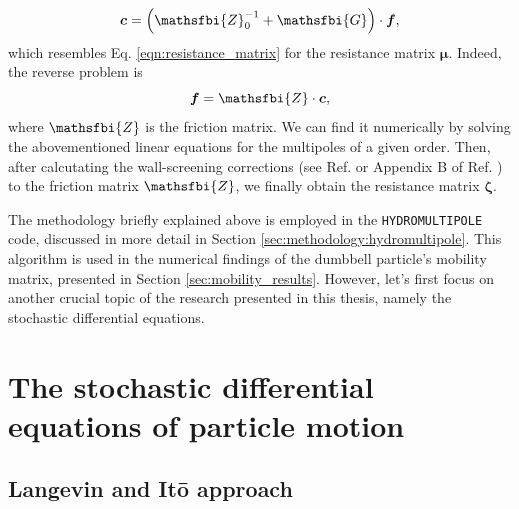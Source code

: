\documentclass{master_thesis}
\def\code#1{\texttt{#1}}
\begin{document}
\begin{equation}
    \boldsymbol{c} = \left( \mathsfbi{Z}_0^{-1} + \mathsfbi{G} \right) \cdot \boldsymbol{f},
\end{equation}
which resembles Eq. \eqref{eqn:resistance_matrix} for the resistance matrix $\bm{\mu}$. Indeed, the reverse problem is
\begin{equation}
    \boldsymbol{f} = \mathsfbi{Z} \cdot \boldsymbol{c},
\end{equation}
where $\mathsfbi{Z}$ is the friction matrix. We can find it numerically by solving the abovementioned linear equations for the multipoles of a given order. Then, after calcutating the wall-screening corrections (see Ref. \cite{ekiel_2009} or Appendix B of Ref. \cite{lisicki2016}) to the friction matrix $\mathsfbi{Z}$, we finally obtain the resistance matrix $\bm{\zeta}$.

The methodology briefly explained above is employed in the \code{HYDROMULTIPOLE} code, discussed in more detail in Section \ref{sec:methodology:hydromultipole}. This algorithm is used in the numerical findings of the dumbbell particle's mobility matrix, presented in Section \ref{sec:mobility_results}. However, let's first focus on another crucial topic of the research presented in this thesis, namely the stochastic differential equations.

\section{The stochastic differential equations of particle motion} \label{sec:sde_theory}

\subsection{Langevin and Itō approach}
\end{document}
